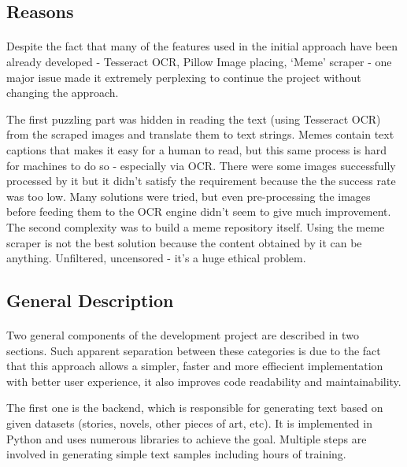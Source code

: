 \documentclass[12pt]{report}
\begin{document}
\subsection*{Reasons}
\paragraph{}
Despite the fact that many of the features used in the initial approach have been already developed - Tesseract OCR, 
Pillow Image placing, `Meme' scraper - one major issue made it extremely perplexing to continue the project without changing the approach.

The first puzzling part was hidden in reading the text (using Tesseract OCR) from the scraped images and translate them to text strings.
Memes contain text captions that makes it easy for a human to read, but this same process is hard for machines to do so - 
especially via OCR. There were some images successfully processed by it but it didn't satisfy the requirement because the the success rate was too low.
Many solutions were tried, but even pre-processing the images before feeding them to the OCR engine didn't seem to give much improvement.
The second complexity was to build a meme repository itself. Using the meme scraper is not the best solution because
the content obtained by it can be anything. Unfiltered, uncensored - it's a huge ethical problem.

\subsection*{General Description}
\paragraph{}
Two general components of the development project are described in two sections. Such apparent separation between these categories 
is due to the fact that this approach allows a simpler, faster and more effiecient implementation with better user
experience, it also improves code readability and maintainability.

The first one is the backend, which is responsible for generating text based on given datasets 
(stories, novels, other pieces of art, etc). It is implemented in Python and uses numerous libraries
to achieve the goal. Multiple steps are involved in generating simple text samples including hours of training.
\end{document}
